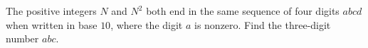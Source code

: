 The positive integers $N$ and $N^2$ both end in the same sequence of four digits $abcd$ when written in base $10$, where the digit $a$ is nonzero. Find the three-digit number $abc$.
